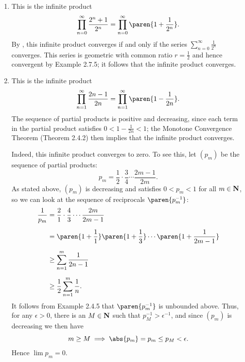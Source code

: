 \documentclass{lew98_solutions}
\begin{document}
\begin{solution}
    \begin{enumerate}
        \item This is the infinite product
        \[
            \prod_{n=0}^{\infty} \frac{2^n + 1}{2^n} = \prod_{n=0}^{\infty} \paren{ 1 + \frac{1}{2^n} }.
        \]
        By , this infinite product converges if and only if the series \( \sum_{n=0}^{\infty} \tfrac{1}{2^n} \) converges. This series is geometric with common ratio \( r = \tfrac{1}{2} \) and hence convergent by Example 2.7.5; it follows that the infinite product converges.

        \item This is the infinite product
        \[
            \prod_{n=1}^{\infty} \frac{2n - 1}{2n} = \prod_{n=1}^{\infty} \paren{ 1 - \frac{1}{2n} }.
        \]
        The sequence of partial products is positive and decreasing, since each term in the partial product satisfies \(0 < 1 - \tfrac{1}{2n} < 1 \); the Monotone Convergence Theorem (Theorem 2.4.2) then implies that the infinite product converges.

        Indeed, this infinite product converges to zero. To see this, let \( (p_m) \) be the sequence of partial products:
        \[
            p_m = \frac{1}{2} \cdot \frac{3}{4} \cdots \frac{2m - 1}{2m}.
        \]
        As stated above, \( (p_m) \) is decreasing and satisfies \( 0 < p_m < 1 \) for all \( m \in \mathbf{N} \), so we can look at the sequence of reciprocals \( \paren{ p_m^{-1} } \):
        \begin{align*}
            \frac{1}{p_m} &= \frac{2}{1} \cdot \frac{4}{3} \cdots \frac{2m}{2m - 1} \\[2mm]
            &= \paren{ 1 + \frac{1}{1} } \paren{ 1 + \frac{1}{3} } \cdots \paren{ 1 + \frac{1}{2m - 1} } \\[2mm]
            &\geq \sum_{n=1}^m \frac{1}{2n - 1} \\[2mm]
            &\geq \frac{1}{2} \sum_{n=1}^m \frac{1}{n}.
        \end{align*}
        It follows from Example 2.4.5 that \( \paren{ p_m^{-1} } \) is unbounded above. Thus, for any \( \epsilon > 0 \), there is an \( M \in \mathbf{N} \) such that \( p_M^{-1} > \epsilon^{-1} \), and since \( (p_m) \) is decreasing we then have
        \[
            m \geq M \implies \abs{p_m} = p_m \leq p_M < \epsilon.
        \]
        Hence \( \lim p_m = 0 \).


\end{enumerate}
\end{solution}
\end{document}
